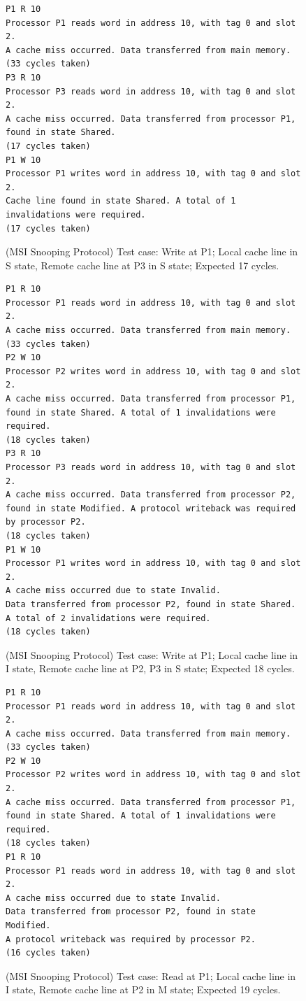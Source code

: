 \documentclass[12pt, a4paper, twoside]{article}
\begin{document}
\begin{figure}[h]
\begin{verbatim}
P1 R 10
Processor P1 reads word in address 10, with tag 0 and slot 2.
A cache miss occurred. Data transferred from main memory.
(33 cycles taken)
P3 R 10
Processor P3 reads word in address 10, with tag 0 and slot 2.
A cache miss occurred. Data transferred from processor P1,
found in state Shared.
(17 cycles taken)
P1 W 10
Processor P1 writes word in address 10, with tag 0 and slot 2.
Cache line found in state Shared. A total of 1 invalidations were required.
(17 cycles taken)
\end{verbatim}
\caption{(MSI Snooping Protocol) Test case: Write at P1; Local cache line in S state, Remote cache line at
P3 in S state; Expected 17 cycles.}
\end{figure}


\begin{figure}[h]
\begin{verbatim}
P1 R 10
Processor P1 reads word in address 10, with tag 0 and slot 2.
A cache miss occurred. Data transferred from main memory.
(33 cycles taken)
P2 W 10
Processor P2 writes word in address 10, with tag 0 and slot 2.
A cache miss occurred. Data transferred from processor P1,
found in state Shared. A total of 1 invalidations were required.
(18 cycles taken)
P3 R 10
Processor P3 reads word in address 10, with tag 0 and slot 2.
A cache miss occurred. Data transferred from processor P2,
found in state Modified. A protocol writeback was required by processor P2.
(18 cycles taken)
P1 W 10
Processor P1 writes word in address 10, with tag 0 and slot 2.
A cache miss occurred due to state Invalid.
Data transferred from processor P2, found in state Shared.
A total of 2 invalidations were required.
(18 cycles taken)
\end{verbatim}
\caption{(MSI Snooping Protocol) Test case: Write at P1; Local cache line in I state, Remote cache line at
P2, P3 in S state; Expected 18 cycles.}
\end{figure}


\begin{figure}[h]
\begin{verbatim}
P1 R 10
Processor P1 reads word in address 10, with tag 0 and slot 2.
A cache miss occurred. Data transferred from main memory.
(33 cycles taken)
P2 W 10
Processor P2 writes word in address 10, with tag 0 and slot 2.
A cache miss occurred. Data transferred from processor P1,
found in state Shared. A total of 1 invalidations were required.
(18 cycles taken)
P1 R 10
Processor P1 reads word in address 10, with tag 0 and slot 2.
A cache miss occurred due to state Invalid.
Data transferred from processor P2, found in state Modified.
A protocol writeback was required by processor P2.
(16 cycles taken)
\end{verbatim}
\caption{(MSI Snooping Protocol) Test case: Read at P1; Local cache line in I state, Remote cache line at
P2 in M state; Expected 19 cycles.}
\end{figure}
\end{document}
